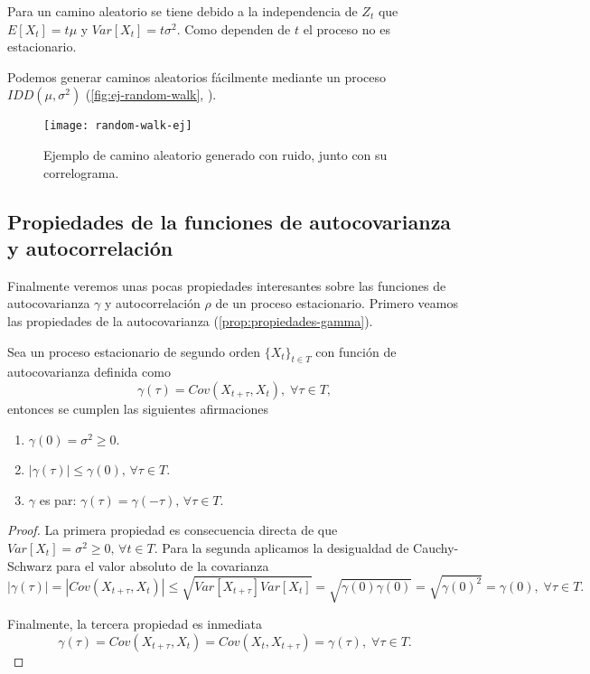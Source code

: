 Para un camino aleatorio se tiene debido a la independencia de $Z_t$ que $E[X_t] = t \mu$ y $Var[X_t] = t \sigma^2$. Como dependen de $t$ el proceso no es estacionario.

Podemos generar caminos aleatorios fácilmente mediante un proceso $IDD(\mu, \sigma^2)$ (\autoref{fig:ej-random-walk}, \cite{chatfield2019analysis}).

\begin{figure}[htpb]
  \centering
  \texttt{[image: random-walk-ej]}
  \caption{Ejemplo de camino aleatorio generado con ruido, junto con su correlograma.}
  \label{fig:ej-random-walk}
\end{figure}

\subsection{Propiedades de la funciones de autocovarianza y autocorrelación}

Finalmente veremos unas pocas propiedades interesantes sobre las funciones de autocovarianza $\gamma$ y autocorrelación $\rho$ de un proceso estacionario. Primero veamos las propiedades de la autocovarianza (\autoref{prop:propiedades-gamma}).

\begin{proposicion}
  Sea un proceso estacionario de segundo orden $\{X_t\}_{t \in T}$ con función de autocovarianza definida como
  $$\gamma(\tau) = Cov(X_{t + \tau}, X_t), \; \forall \tau \in T,$$
  entonces se cumplen las siguientes afirmaciones
  \begin{enumerate}
    \item $\gamma(0) = \sigma^2 \geq 0$.
    \item $|\gamma(\tau)| \leq \gamma(0), \, \forall \tau \in T$.
    \item $\gamma$ es par: $\gamma(\tau) = \gamma(-\tau), \, \forall \tau \in T$.
  \end{enumerate}
  \label{prop:propiedades-gamma}
\end{proposicion}

\begin{proof}
  La primera propiedad es consecuencia directa de que $Var[X_t] = \sigma^2 \geq 0, \, \forall t \in T$. Para la segunda aplicamos la desigualdad de Cauchy-Schwarz para el valor absoluto de la covarianza
    $$|\gamma(\tau)| = |Cov(X_{t+\tau}, X_t)| \leq \sqrt{Var[X_{t+\tau}]Var[X_t]} = \sqrt{\gamma(0)\gamma(0)} = \sqrt{\gamma(0)^2} = \gamma(0), \; \forall \tau \in T.$$

  Finalmente, la tercera propiedad es inmediata
  $$\gamma(\tau) = Cov(X_{t + \tau}, X_t) = Cov(X_t, X_{t + \tau}) = \gamma(\tau), \; \forall \tau \in T.$$
\end{proof}


